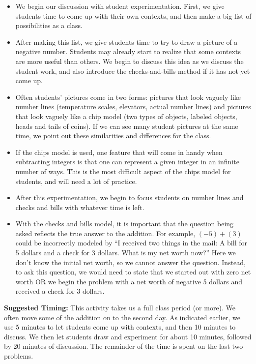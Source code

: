 \documentclass[ nooutcomes,noauthor,handout]{ximera}
\begin{document}
\begin{instructorNotes}
\begin{itemize}
    \item We begin our discussion with student experimentation.  First, we give students time to come up with their own contexts, and then make a big list of possibilities as a class.
    \item After making this list, we give students time to try to draw a picture of a negative number.  Students may already start to realize that some contexts are more useful than others.  We begin to discuss this idea as we discuss the student work, and also introduce the checks-and-bills method if it has not yet come up.
    \item Often students' pictures come in two forms: pictures that look vaguely like number lines (temperature scales, elevators, actual number lines) and pictures that look vaguely like a chip model (two types of objects, labeled objects, heads and tails of coins).  If we can see many student pictures at the same time, we point out these similarities and differences for the class.
    \item  If the chips model is used, one feature that will come in handy when subtracting integers is that one can represent a given integer in an infinite number of ways. This is the most difficult aspect of the chips model for students, and will need a lot of practice.
    \item After this experimentation, we begin to focus students on number lines and checks and bills with whatever time is left.
    \item  With the checks and bills model, it is important that the question being asked reflects the true answer to the addition.  For example, $(-5) + (3)$ could be incorrectly modeled by ``I received two things in the mail: A bill for 5 dollars and a check for 3 dollars.  What is my net worth now?''  Here we don't know the initial net worth, so we cannot answer the question.  Instead, to ask this question, we would need to state that we started out with zero net worth OR we begin the problem with a net worth of negative 5 dollars and received a check for 3 dollars.
\end{itemize}

{\bf Suggested Timing:} This activity takes us a full class period (or more).  We often move some of the addition on to the second day.  As indicated earlier, we use 5 minutes to let students come up with contexts, and then 10 minutes to discuss.  We then let students draw and experiment for about 10 minutes, followed by 20 minutes of discussion.  The remainder of the time is spent on the last two problems.
\end{instructorNotes}
\end{document}
